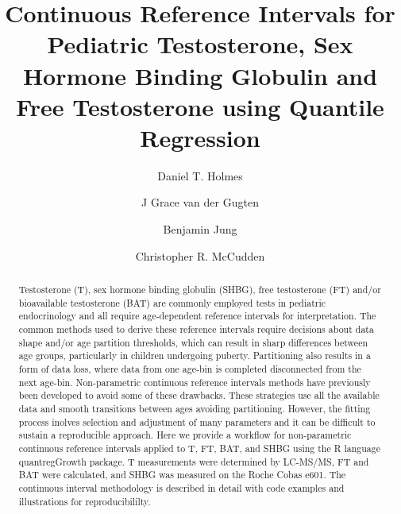 \documentclass[]{elsarticle} %
\begin{document}
\begin{frontmatter}

  \title{Continuous Reference Intervals for Pediatric Testosterone, Sex
Hormone Binding Globulin and Free Testosterone using Quantile
Regression}
    \author[SPH,UBC]{Daniel T. Holmes}
    \author[SPH]{J Grace van der Gugten}
    \author[HSC]{Benjamin Jung}
    \author[UO,TOH,EORLA]{Christopher R. McCudden}
      \address[SPH]{St.~Paul's Hospital Department of Pathology and
Laboratory Medicine, 1081 Burrard St., Vancouver, BC V6Z 1Y6 Canada}
    \address[UBC]{University of British Columbia Department of Pathology
and Laboratory Medicine, 2211 Wesbrook Mall, Vancouver, BC V6T 1Z7
Canada}
    \address[TOH]{Department of Pathology and Laboratory Medicine,
Ottawa Hospital, General Campus, 501 Smyth Road, Ottawa, ON K1H 8L6
Canada}
    \address[UO]{Department of Pathology and Laboratory Medicine,
University of Ottawa}
    \address[EORLA]{Eastern Ontario Regional Laboratory Association}
    \address[HSC]{Hospital for Sick Children (SickKids), 555 University
Ave., Department of Paediatric Laboratory Medicine, Toronto, ON, M5G
1X8}
  
  \begin{abstract}
  Testosterone (T), sex hormone binding globulin (SHBG), free
  testosterone (FT) and/or bioavailable testosterone (BAT) are commonly
  employed tests in pediatric endocrinology and all require
  age-dependent reference intervals for interpretation. The common
  methods used to derive these reference intervals require decisions
  about data shape and/or age partition thresholds, which can result in
  sharp differences between age groups, particularly in children
  undergoing puberty. Partitioning also results in a form of data loss,
  where data from one age-bin is completed disconnected from the next
  age-bin. Non-parametric continuous reference intervals methods have
  previously been developed to avoid some of these drawbacks. These
  strategies use all the available data and smooth transitions between
  ages avoiding partitioning. However, the fitting process inolves
  selection and adjustment of many parameters and it can be difficult to
  sustain a reproducible approach. Here we provide a workflow for
  non-parametric continuous reference intervals applied to T, FT, BAT,
  and SHBG using the R language quantregGrowth package. T measurements
  were determined by LC-MS/MS, FT and BAT were calculated, and SHBG was
  measured on the Roche Cobas e601. The continuous interval methodology
  is described in detail with code examples and illustrations for
  reproducibililty.
  \end{abstract}
  
 \end{frontmatter}
\end{document}
